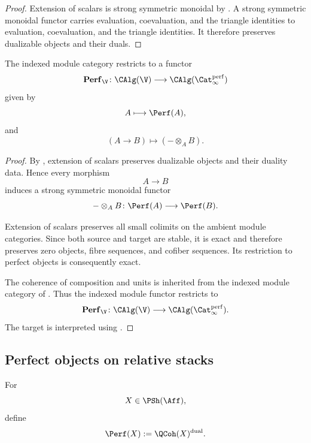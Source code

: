 \begin{proof}
Extension of scalars is strong symmetric monoidal by
.
A strong symmetric monoidal functor carries evaluation, coevaluation, and
the triangle identities to evaluation, coevaluation, and the triangle
identities. It therefore preserves dualizable objects and their duals.
\end{proof}

\begin{proposition}
\label{prop:indexed-perfect-category}
The indexed module category restricts to a functor
\[
    \mathbf{Perf}_{\V}
    \colon
    \CAlg(\V)
    \longrightarrow
    \CAlg(\Cat_\infty^{\mathrm{perf}})
\]
given by
\[
    A
    \longmapsto
    \Perf(A),
\]
and
\[
    (A\to B)
    \longmapsto
    (-\otimes_A B).
\]
\end{proposition}

\begin{proof}
By
,
extension of scalars preserves dualizable objects and their duality data.
Hence every morphism
\[
    A
    \longrightarrow
    B
\]
induces a strong symmetric monoidal functor
\[
    -\otimes_A B
    \colon
    \Perf(A)
    \longrightarrow
    \Perf(B).
\]

Extension of scalars preserves all small colimits on the ambient module
categories. Since both source and target are stable, it is exact and
therefore preserves zero objects, fibre sequences, and cofiber sequences.
Its restriction to perfect objects is consequently exact.

The coherence of composition and units is inherited from the indexed
module category of
.
Thus the indexed module functor restricts to
\[
    \mathbf{Perf}_{\V}
    \colon
    \CAlg(\V)
    \longrightarrow
    \CAlg(\Cat_\infty^{\mathrm{perf}}).
\]
The target is interpreted using
.
\end{proof}

\subsection{Perfect objects on relative stacks}

\begin{definition}
\label{def:perfect-qcoh-object}
For
\[
    X\in\PSh(\Aff),
\]
define
\[
    \Perf(X)
    :=
    \QCoh(X)^{\mathrm{dual}}.
\]
\end{definition}

